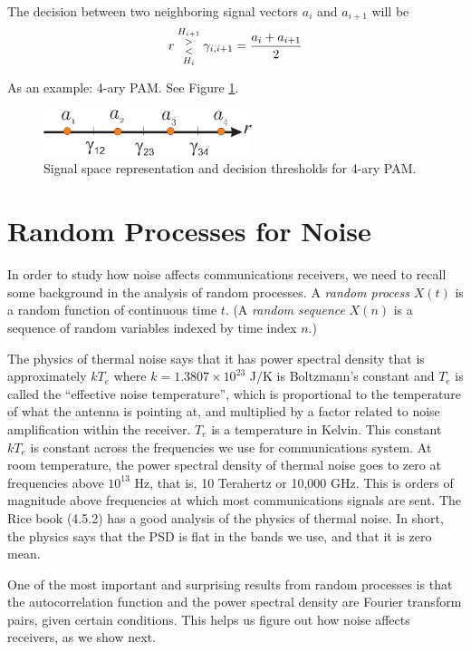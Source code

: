 The decision between two neighboring signal vectors $a_i$ and
$a_{i+1}$ will be
\[
 r  {{H_{i+1} \atop >} \atop {< \atop H_i}} \gamma_{i,i+1} = \frac{a_i + a_{i+1}}{2}
\]


As an example:  4-ary PAM.  See Figure
\ref{F:4AryPAM-DecisionThresholds}.

  \begin{figure}[htbp]
    \centerline{\includegraphics[width=2.4in]{../images/4AryPAM-DecisionThresholds.eps} }
    \caption{Signal space representation and decision thresholds for 4-ary PAM.}
    \label{F:4AryPAM-DecisionThresholds}
  \end{figure}


\section{Random Processes for Noise}

In order to study how noise affects communications receivers, we need to recall some background in the analysis of random processes.  A \emph{random process} $X(t)$ is a random function of continuous time $t$. (A \emph{random sequence} $X(n)$ is a sequence of random variables indexed by time index $n$.)  

The physics of thermal noise says that it has power spectral density that is approximately $kT_e$ where $k=1.3807\times 10^{23}$ J/K is Boltzmann's constant and $T_e$ is called the ``effective noise temperature'', which is proportional to the temperature of what the antenna is pointing at, and multiplied by a factor related to noise amplification within the receiver.  $T_e$ is a temperature in Kelvin.  This constant $kT_e$ is constant across the frequencies we use for communications system.  At room temperature, the power spectral density of thermal noise goes to zero at frequencies above $10^{13}$ Hz, that is, 10 Terahertz or 10,000 GHz.  This is orders of magnitude above frequencies at which most communications signals are sent.  The Rice book (4.5.2) has a good analysis of
the physics of thermal noise.  In short, the physics says that the PSD is flat in the bands we use, and that it is zero mean.

One of the most important and surprising results from random processes is that the autocorrelation function and the power spectral density are Fourier transform pairs, given certain conditions.  This helps us figure out how noise affects receivers, as we show next. 


